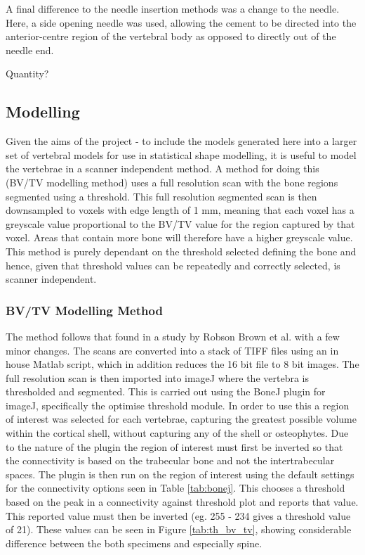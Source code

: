 A final difference to the needle insertion methods was a change to the needle.
Here, a side opening needle was used, allowing the cement to be directed into the anterior-centre region of the vertebral body as opposed to directly out of the needle end.

Quantity?


\subsection{Modelling}

Given the aims of the project - to include the models generated here into a larger set of vertebral models for use in statistical shape modelling, it is useful to model the vertebrae in a scanner independent method.
A method for doing this (BV/TV modelling method) uses a full resolution scan with the bone regions segmented using a threshold.
This full resolution segmented scan is then downsampled to voxels with edge length of 1 mm, meaning that each voxel has a greyscale value proportional to the BV/TV value for the region captured by that voxel.
Areas that contain more bone will therefore have a higher greyscale value.
This method is purely dependant on the threshold selected defining the bone and hence, given that threshold values can be repeatedly and correctly selected, is scanner independent.

\subsubsection{BV/TV Modelling Method}

The method follows that found in a study by Robson Brown et al. \cite{RobsonBrown2014} with a few minor changes.
The scans are converted into a stack of TIFF files using an in house Matlab script, which in addition reduces the 16 bit file to 8 bit images.
The full resolution scan is then imported into imageJ where the vertebra is thresholded and segmented.
This is carried out using the BoneJ plugin for imageJ, specifically the optimise threshold module.
In order to use this a region of interest was selected for each vertebrae, capturing the greatest possible volume within the cortical shell, without capturing any of the shell or osteophytes.
Due to the nature of the plugin the region of interest must first be inverted so that the connectivity is based on the trabecular bone and not the intertrabecular spaces.
The plugin is then run on the region of interest using the default settings for the connectivity options seen in Table \ref{tab:bonej}.
This chooses a threshold based on the peak in a connectivity against threshold plot and reports that value.
This reported value must then be inverted (eg. 255 - 234 gives a threshold value of 21).
These values can be seen in Figure \ref{tab:th_bv_tv}, showing considerable difference between the both specimens and especially spine.

